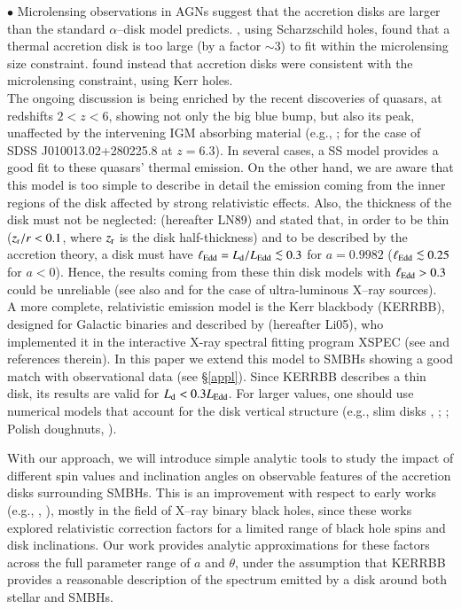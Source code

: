 \documentclass{aa}
\def\spose#1{\hbox to 0pt{#1\hss}}
\newcommand\lsim{\mathrel{\spose{\lower 3pt\hbox{$\mathchar"218$}}
     \raise 2.0pt\hbox{$\mathchar"13C$}}}
\begin{document}
$\bullet$ Microlensing observations in AGNs suggest that the accretion disks are larger than the standard $\alpha$--disk model predicts. \citet{RauchBland}, using Scharzschild holes, found that a thermal accretion disk is too large (by a factor $\sim$3) to fit within the microlensing size constraint. \citet{Jarosetal} found instead that accretion disks were consistent with the microlensing constraint, using Kerr holes. \\

The ongoing discussion is being enriched by the recent discoveries of quasars, at redshifts $2<z<6$, showing not only the big blue bump, but also its peak, unaffected by the intervening IGM absorbing material (e.g., \citealt{Shawetal}; \citealt{Aietal} for the case of SDSS J010013.02+280225.8 at $z=6.3$). In several cases, a SS model provides a good fit to these quasars' thermal emission. On the other hand, we are aware that this model is too simple to describe in detail the emission coming from the inner regions of the disk affected by strong relativistic effects. Also, the thickness of the disk must not be neglected: \citet{LaoNet} (hereafter LN89) and \citet{McClint} stated that, in order to be thin ($z_{\rm r}/r < 0.1$, where $z_{\rm r}$ is the disk half-thickness) and to be described by the \citet{NovTho} accretion theory, a disk must have $\ell_{\rm Edd} = L_{\rm d} / L_{\rm Edd} \lsim 0.3$ for $a=0.9982$ ($\ell_{\rm Edd} \lsim 0.25$ for $a<0$). Hence, the results coming from these thin disk models with $\ell_{\rm Edd} > 0.3$ could be unreliable (see also \citealt{Straubetal} and \citealt{Wieletal} for the case of ultra-luminous X--ray sources).\\

A more complete, relativistic emission model is the Kerr blackbody (KERRBB), designed for Galactic binaries and described by \citet{Lietal} (hereafter Li05), who implemented it in the interactive X-ray spectral fitting program XSPEC (see \citealt{ArnaudXPS} and references therein). In this paper we extend this model to SMBHs showing a good match with observational data (see \S \ref{appl}). Since KERRBB describes a thin disk, its results are valid for $L_{\rm d} < 0.3 L_{\rm Edd}$. For larger values, one should use numerical models that account for the disk vertical structure (e.g., slim disks \citealt{Abretal}, \citealt{SadwAbra}; \citealt{Straubetal}; Polish doughnuts, \citealt{Wieletal}).

With our approach, we will introduce simple analytic tools to study the impact of different spin values and inclination angles on observable features of the accretion disks surrounding SMBHs. This is an improvement with respect to early works (e.g., \citealt{Cunnin}, \citealt{Zhangetal2}), mostly in the field of X--ray binary black holes, since these works explored relativistic correction factors for a limited range of black hole spins and disk inclinations. Our work provides analytic approximations for these factors across the full parameter range of $a$ and $\theta$, under the assumption that KERRBB provides a reasonable description of the spectrum emitted by a disk around both stellar and SMBHs.\\
\end{document}
